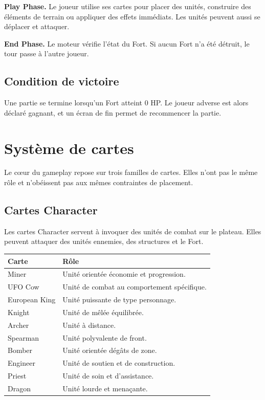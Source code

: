 \documentclass[12pt,a4paper]{article}
\begin{document}
\textbf{Play Phase.} Le joueur utilise ses cartes pour placer des unités, construire des éléments de terrain ou appliquer des effets immédiats. Les unités peuvent aussi se déplacer et attaquer.

\textbf{End Phase.} Le moteur vérifie l'état du Fort. Si aucun Fort n'a été détruit, le tour passe à l'autre joueur.

\subsection{Condition de victoire}
Une partie se termine lorsqu'un Fort atteint 0 HP. Le joueur adverse est alors déclaré gagnant, et un écran de fin permet de recommencer la partie.

\section{Système de cartes}
Le cœur du gameplay repose sur trois familles de cartes. Elles n'ont pas le même rôle et n'obéissent pas aux mêmes contraintes de placement.

\subsection{Cartes Character}
Les cartes Character servent à invoquer des unités de combat sur le plateau. Elles peuvent attaquer des unités ennemies, des structures et le Fort.

\begin{longtable}{p{} p{}}
\toprule
\textbf{Carte} & \textbf{Rôle} \\
\midrule
Miner & Unité orientée économie et progression. \\
UFO Cow & Unité de combat au comportement spécifique. \\
European King & Unité puissante de type personnage. \\
Knight & Unité de mêlée équilibrée. \\
Archer & Unité à distance. \\
Spearman & Unité polyvalente de front. \\
Bomber & Unité orientée dégâts de zone. \\
Engineer & Unité de soutien et de construction. \\
Priest & Unité de soin et d'assistance. \\
Dragon & Unité lourde et menaçante. \\
\bottomrule
\end{longtable}
\end{document}
